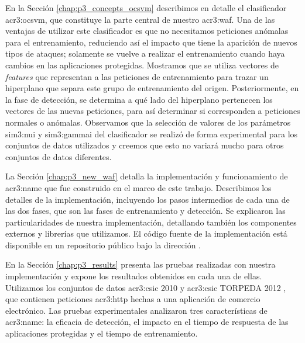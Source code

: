 En la Sección \ref{chap:p3_concepts_ocsvm} describimos en detalle el
clasificador \gls{acr3:ocsvm}, que constituye la parte central de nuestro
\gls{acr3:waf}. Una de las ventajas de utilizar este clasificador es que
no necesitamos peticiones anómalas para el entrenamiento, reduciendo así
el impacto que tiene la aparición de nuevos tipos de ataques; solamente
se vuelve a realizar el entrenamiento cuando haya cambios en las aplicaciones
protegidas.
Mostramos que se utiliza vectores de \textit{features} que representan
a las peticiones de entrenamiento para trazar un hiperplano que separa
este grupo de entrenamiento del origen. Posteriormente, en la fase de
detección, se determina a qué lado del hiperplano pertenecen los vectores
de las nuevas peticiones, para así determinar si corresponden a peticiones
normales o anómalas.
Observamos que la selección de valores de los parámetros \gls{sim3:nui}
y \gls{sim3:gammai} del clasificador se realizó de forma experimental
para los conjuntos de datos utilizados y creemos que esto no variará
mucho para otros conjuntos de datos diferentes.

La Sección \ref{chap:p3_new_waf} detalla la implementación y funcionamiento
de \gls{acr3:name} que fue construido en el marco de este trabajo.
Describimos los detalles de la implementación, incluyendo los pasos
intermedios de cada una de las dos fases, que son las fases de entrenamiento
y detección. Se explicaron las particularidades de nuestra implementación,
detallando también los componentes externos y librerías que utilizamos.
El código fuente de la implementación está disponible en un repositorio
público bajo la dirección \TheRepoUrl.

En la Sección \ref{chap:p3_results} presenta las pruebas realizadas con nuestra
implementación y expone los resultados obtenidos en cada una de ellas.
Utilizamos los conjuntos de datos \gls{acr3:csic} 2010 \cite{csic2010dataset}
y \gls{acr3:csic} TORPEDA 2012 \cite{torpeda2012dataset}, que contienen
peticiones \gls{acr3:http} hechas a una aplicación de comercio electrónico.
Las pruebas experimentales analizaron tres características de \gls{acr3:name}:
la eficacia de detección, el impacto en el tiempo de respuesta de las
aplicaciones protegidas y el tiempo de entrenamiento.

